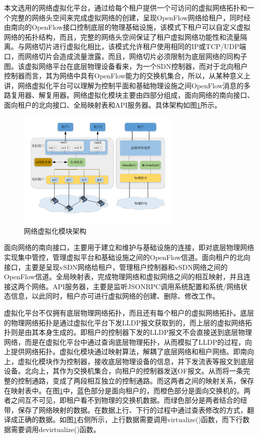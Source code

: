 本文选用的网络虚拟化平台，通过给每个租户提供一个可访问的虚拟网络拓扑和一个完整的网络头空间来完成虚拟网络的创建，呈现OpenFlow网络给租户，同时经由南向的OpenFlow接口控制底层的物理基础设施，该模式下租户可以自定义虚拟网络的拓扑结构，而且，完整的网络头空间保证了租户虚拟网络功能性和流量隔离\cite{Virtual-3}。与网络切片进行虚拟化相比，该模式允许租户使用相同的IP或TCP/UDP端口，而网络切片会造成流量泄露，而且，网络切片必须限制为底层网络的同构子图。该虚拟网络平台在底层物理设备看来，为一个SDN控制器，而对于北向租户控制器而言，其为网络中具有OpenFlow能力的交换机集合，所以，从某种意义上讲，网络虚拟化平台可以理解为控制平面和基础物理设施之间OpenFlow消息的多路复用器、解复用器。网络虚拟化模块主要由四部分组成，面向网络的南向接口、面向租户的北向接口、全局映射表和API服务器\cite{OVX-1}。具体架构如图\ref{fig:virtual}所示。

\begin{figure}[!htb]
  \centering
  \includegraphics[width=0.7\textwidth]{logo/virtual-detail}
  \caption{网络虚拟化模块架构}
  \label{fig:virtual}
\end{figure}

面向网络的南向接口，主要用于建立和维护与基础设施的连接，即对底层物理网络实现集中管控，管理虚拟平台和基础设施之间的OpenFlow信道。面向租户的北向接口，主要是呈现vSDN网络给租户，管理租户控制器和vSDN网络之间的OpenFlow信道。全局映射表，完成物理网络和虚拟网络之间的相互映射，并且连接这两个网络。API服务器，主要是监听JSONRPC调用系统配置和系统/网络状态信息，以此同时，租户亦可进行虚拟网络的创建、删除、修改工作。

虚拟化平台不仅拥有底层物理网络拓扑，而且还有每个租户的虚拟网络拓扑。底层的物理网络拓扑是通过虚拟化平台下发LLDP报文获取到的，而上层的虚拟网络拓扑则是由其本身生成的。即租户的控制器下发的LLDP报文不会直接送到底层物理网络，而是在虚拟化平台中通过查询底层物理拓扑，从而模拟了LLDP的过程，向上提供网络拓扑。虚拟化模块通过映射算法，解耦了底层网络和租户网络。即南向上，虚拟化模块作为控制器，接收底层物理设备的信息，并下发流表等报文到底层设备。北向上，其作为交换机集合，向租户的控制器发送OF报文。从而将一条完整的控制通路，变成了两段相互独立的控制通路。而这两者之间的映射关系，保存在映射表中。在图\ref{fig:virtual}中，蓝色部分是面向租户的，而橙色部分是面向交换机的。两者之间互不可见，即租户看不到物理的交换机数据。而绿色部分是两者结合的纽带，保存了网络映射的数据。在数据上行、下行的过程中通过查表修改的方式，翻译成正确的数据。如图\ref{fig:virtual}右侧所示，上行数据需要调用virtualize()函数，而下行数据需要调用devirtualize()函数。

